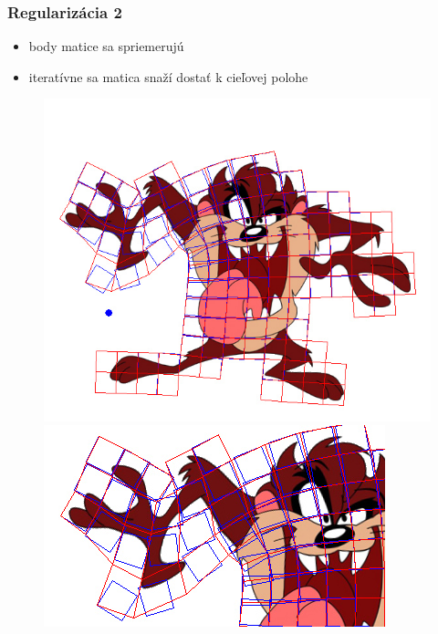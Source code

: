 \documentclass[a4paper]{beamer}
\begin{document}
\begin{frame}	
	\frametitle{Regularizácia 2}
	\begin{itemize}
		\item body matice sa spriemerujú
		\item iteratívne sa matica snaží dostať k cieľovej polohe
	\end{itemize}

	\begin{figure}
		\centering
		\includegraphics[height=0.5\textheight,keepaspectratio]{pic/taz_rigid.jpg}
		\includegraphics[height=0.5\textheight,keepaspectratio]{pic/taz_rigid_detail.jpg}
	\end{figure}
\end{frame}
\end{document}

